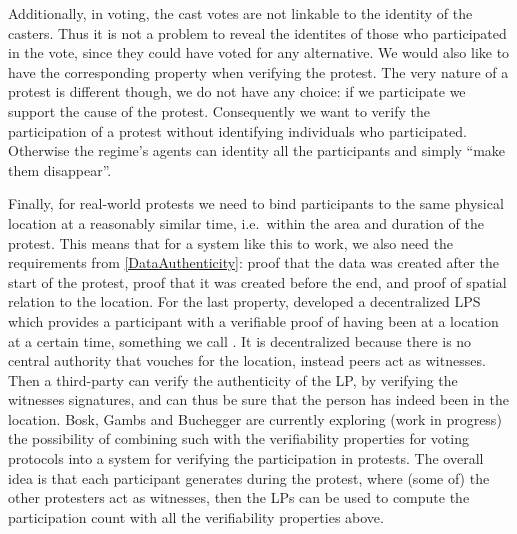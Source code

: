 Additionally, in voting, the cast votes are not linkable to the identity of the 
casters.
Thus it is not a problem to reveal the identites of those who participated in 
the vote, since they could have voted for any alternative.
We would also like to have the corresponding property when verifying the 
protest.
The very nature of a protest is different though, we do not have any choice: if 
we participate we support the cause of the protest. %
Consequently we want to verify the participation of a protest without 
identifying individuals who participated.
Otherwise the regime's agents can identity all the participants and simply 
\enquote{make them disappear}. %

Finally, for real-world protests we need to bind participants to the same 
physical location at a reasonably similar time, i.e.\ within the area and 
duration of the protest.
This means that for a system like this to work, we also need the requirements 
from \cref{DataAuthenticity}: proof that the data was created after the start 
of the protest, proof that it was created before the end, and proof of spatial 
relation to the location.
For the last property, \citet{PROPS} developed a decentralized \ac{LPS} which 
provides a participant with a verifiable proof of having been at a location at 
a certain time, something we call .
It is decentralized because there is no central authority that vouches for the 
location, instead peers act as witnesses.
Then a third-party can verify the authenticity of the \ac{LP}, by verifying the 
witnesses signatures, and can thus be sure that the person has indeed been in 
the location.
Bosk, Gambs and Buchegger are currently exploring (work in progress) the 
possibility of combining such  with the verifiability properties for 
voting protocols into a system for verifying the participation in protests.
The overall idea is that each participant generates  during the 
protest, where (some of) the other protesters act as witnesses, then the 
\acp{LP} can be used to compute the participation count with all the 
verifiability properties above.
